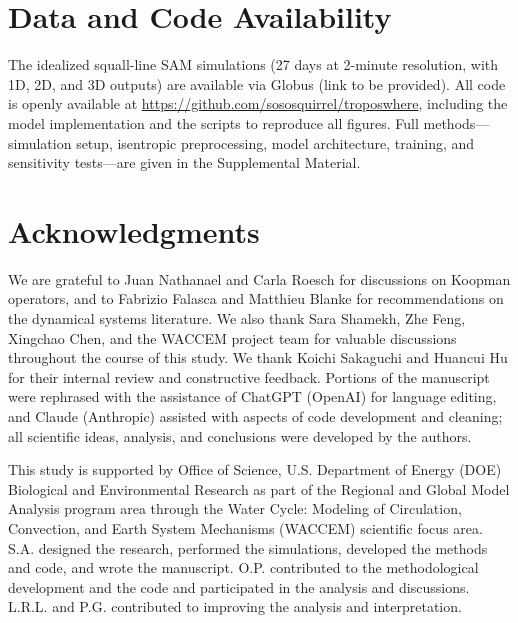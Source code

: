\documentclass[
    aps,
    prl,
    reprint,
    superscriptaddress,
    amsmath,amssymb,
    floatfix,
    nofootinbib
]{revtex4-2}
\begin{document}
\section*{Data and Code Availability}

The idealized squall-line SAM simulations (27 days at 2-minute resolution, with 1D, 2D, and 3D outputs) are available via Globus (link to be provided). All code is openly available at \url{https://github.com/sososquirrel/troposwhere}, including the model implementation and the scripts to reproduce all figures. Full methods---simulation setup, isentropic preprocessing, model architecture, training, and sensitivity tests---are given in the Supplemental Material.

\section*{Acknowledgments}

We are grateful to Juan Nathanael and Carla Roesch for discussions on Koopman operators, and to Fabrizio Falasca and Matthieu Blanke for recommendations on the dynamical systems literature. We also thank Sara Shamekh, Zhe Feng, Xingchao Chen, and the WACCEM project team for valuable discussions throughout the course of this study. We thank Koichi Sakaguchi and Huancui Hu for their internal review and constructive feedback. Portions of the manuscript were rephrased with the assistance of ChatGPT (OpenAI) for language editing, and Claude (Anthropic) assisted with aspects of code development and cleaning; all scientific ideas, analysis, and conclusions were developed by the authors. 

This study is supported by Office of Science, U.S. Department of Energy (DOE) Biological and Environmental Research as part of the Regional and Global Model Analysis program area through the Water Cycle: Modeling of Circulation, Convection, and Earth System Mechanisms (WACCEM) scientific focus area. S.A. designed the research, performed the simulations, developed the methods and code, and wrote the manuscript. O.P. contributed to the methodological development and the code and participated in the analysis and discussions. L.R.L. and P.G. contributed to improving the analysis and interpretation.



\end{document}
